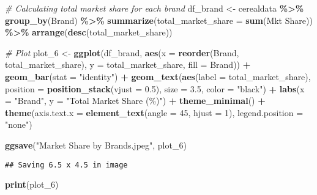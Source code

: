 \documentclass[
]{article}
\newenvironment{Shaded}{\begin{snugshade}}{\end{snugshade}}
\newcommand{\AttributeTok}[1]{\textcolor[rgb]{0.13,0.29,0.53}{#1}}
\newcommand{\CommentTok}[1]{\textcolor[rgb]{0.56,0.35,0.01}{\textit{#1}}}
\newcommand{\DecValTok}[1]{\textcolor[rgb]{0.00,0.00,0.81}{#1}}
\newcommand{\FloatTok}[1]{\textcolor[rgb]{0.00,0.00,0.81}{#1}}
\newcommand{\FunctionTok}[1]{\textcolor[rgb]{0.13,0.29,0.53}{\textbf{#1}}}
\newcommand{\NormalTok}[1]{#1}
\newcommand{\OtherTok}[1]{\textcolor[rgb]{0.56,0.35,0.01}{#1}}
\newcommand{\SpecialCharTok}[1]{\textcolor[rgb]{0.81,0.36,0.00}{\textbf{#1}}}
\newcommand{\StringTok}[1]{\textcolor[rgb]{0.31,0.60,0.02}{#1}}
\begin{document}
\begin{Shaded}
\begin{Highlighting}[]
\CommentTok{\# Calculating total market share for each brand}
\NormalTok{df\_brand }\OtherTok{\textless{}{-}}\NormalTok{ cerealdata }\SpecialCharTok{\%\textgreater{}\%}
  \FunctionTok{group\_by}\NormalTok{(Brand) }\SpecialCharTok{\%\textgreater{}\%}
  \FunctionTok{summarize}\NormalTok{(}\AttributeTok{total\_market\_share =} \FunctionTok{sum}\NormalTok{(}\StringTok{\textasciigrave{}}\AttributeTok{Mkt Share}\StringTok{\textasciigrave{}}\NormalTok{)) }\SpecialCharTok{\%\textgreater{}\%}
  \FunctionTok{arrange}\NormalTok{(}\FunctionTok{desc}\NormalTok{(total\_market\_share))}

\CommentTok{\# Plot}
\NormalTok{plot\_6 }\OtherTok{\textless{}{-}} \FunctionTok{ggplot}\NormalTok{(df\_brand, }\FunctionTok{aes}\NormalTok{(}\AttributeTok{x =} \FunctionTok{reorder}\NormalTok{(Brand, total\_market\_share), }\AttributeTok{y =}\NormalTok{ total\_market\_share, }\AttributeTok{fill =}\NormalTok{ Brand)) }\SpecialCharTok{+}
  \FunctionTok{geom\_bar}\NormalTok{(}\AttributeTok{stat =} \StringTok{"identity"}\NormalTok{) }\SpecialCharTok{+}
  \FunctionTok{geom\_text}\NormalTok{(}\FunctionTok{aes}\NormalTok{(}\AttributeTok{label =}\NormalTok{ total\_market\_share), }\AttributeTok{position =} \FunctionTok{position\_stack}\NormalTok{(}\AttributeTok{vjust =} \FloatTok{0.5}\NormalTok{), }\AttributeTok{size =} \FloatTok{3.5}\NormalTok{, }\AttributeTok{color =} \StringTok{"black"}\NormalTok{) }\SpecialCharTok{+}
  \FunctionTok{labs}\NormalTok{(}\AttributeTok{x =} \StringTok{"Brand"}\NormalTok{,}
       \AttributeTok{y =} \StringTok{"Total Market Share (\%)"}\NormalTok{) }\SpecialCharTok{+}
  \FunctionTok{theme\_minimal}\NormalTok{() }\SpecialCharTok{+}
  \FunctionTok{theme}\NormalTok{(}\AttributeTok{axis.text.x =} \FunctionTok{element\_text}\NormalTok{(}\AttributeTok{angle =} \DecValTok{45}\NormalTok{, }\AttributeTok{hjust =} \DecValTok{1}\NormalTok{),}
        \AttributeTok{legend.position =} \StringTok{"none"}\NormalTok{)}

\FunctionTok{ggsave}\NormalTok{(}\StringTok{"Market Share by Brands.jpeg"}\NormalTok{, plot\_6)}
\end{Highlighting}
\end{Shaded}

\begin{verbatim}
## Saving 6.5 x 4.5 in image
\end{verbatim}

\begin{Shaded}
\begin{Highlighting}[]
\FunctionTok{print}\NormalTok{(plot\_6)}
\end{Highlighting}
\end{Shaded}
\end{document}
